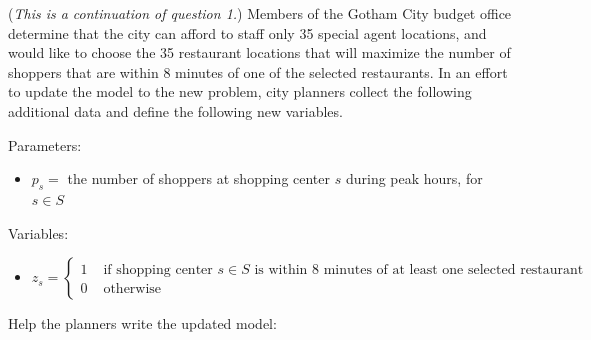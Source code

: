 \documentclass[12pt]{exam}
\newcommand{\answerbox}[3]{%
  \fbox{%
    \begin{minipage}[#1]{#2}
      \hfill\vspace{#3}
    \end{minipage}
  }
}
\newcommand{\answerboxone}[2]{%
  \answerbox{#1}{6.0in}{#2} 
}
\begin{document}
\begin{questions}
\newpage
\question (\emph{This is a continuation of question 1.}) Members of the Gotham City budget office determine that the city can afford to staff only 35 special agent locations, and would like to choose the 35 restaurant locations that will maximize the number of shoppers that are within 8 minutes of one of the selected restaurants.  In an effort to update the model to the new problem, city planners collect the following additional data and define the following new variables.
	
Parameters:
\begin{itemize}
\item[] $p_{s} = $ the number of shoppers at shopping center $s$ during peak hours, for $s \in S$
\end{itemize}

Variables:
\begin{itemize}
\item[] $z_s = \left\{
\begin{array}{ll}
1 & \text{ if shopping center $s \in S$ is within 8 minutes of at least one selected restaurant } \\
0 & \text{ otherwise }
\end{array}\right.$
\end{itemize}

Help the planners write the updated model:
\end{questions}
\end{document}
